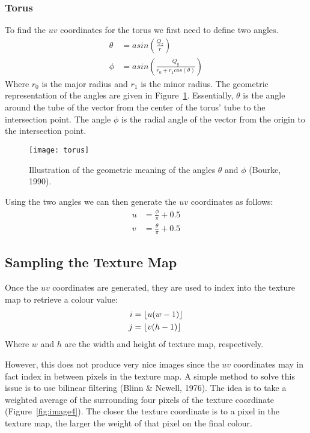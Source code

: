 \subsubsection*{Torus}
To find the $uv$ coordinates for the torus we first need to define two angles.
\begin{equation}
\begin{split}
  \theta &= asin(\frac{Q_{z}}{r}) \\
  \phi &= asin(\frac{Q_{y}}{r_{0} + r_{1}cos(\theta)})
\end{split}
\end{equation}
Where $r_{0}$ is the major radius and $r_{1}$ is the minor radius. The geometric
representation of the angles are given in Figure~\ref{fig:image3}. Essentially,
$\theta$ is the angle around the tube of the vector from the center of the 
torus' tube to the intersection point. The angle $\phi$ is the radial angle of
the vector from the origin to the intersection point.

\begin{figure}[ht]
  \texttt{[image: torus]}
  \caption{Illustration of the geometric meaning of the angles $\theta$ and $\phi$ (Bourke, 1990).}
  \label{fig:image3}
\end{figure}

Using the two angles we can then generate the $uv$ coordinates as follows:
\begin{equation}
\begin{split}
  u &= \frac{\phi}{\pi} + 0.5 \\
  v &= \frac{\theta}{\pi} + 0.5
\end{split}
\end{equation}

\subsection{Sampling the Texture Map}
Once the $uv$ coordinates are generated, they are used to index into the texture
map to retrieve a colour value:
\begin{equation}
\begin{split}
  i &= \floor*{u(w - 1)} \\
  j &= \floor*{v(h - 1)}
\end{split}
\end{equation}
Where $w$ and $h$ are the width and height of texture map, respectively.

However, this does not produce very nice images since the $uv$ coordinates may
in fact index in between pixels in the texture map. A simple method to solve
this issue is to use bilinear filtering (Blinn \& Newell, 1976). The idea is to
take a weighted average of the surrounding four pixels of the texture coordinate
(Figure~\ref{fig:image4}). The closer the texture coordinate is to a pixel in
the texture map, the larger the weight of that pixel on the final colour.

